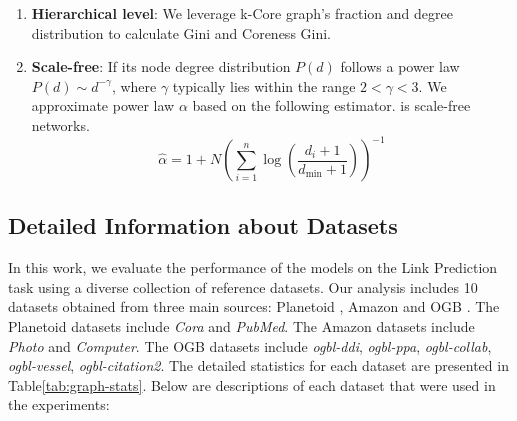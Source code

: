 \begin{enumerate}[left=0pt, labelsep=0.5em, itemsep=0em]
    \item \textbf{Hierarchical level}: We leverage k-Core graph's fraction and degree distribution to calculate Gini and Coreness Gini. 
    \item \textbf{Scale-free}: If its node degree distribution $P(d)$ follows a power law $P(d) \sim d^{-\gamma}$, where $\gamma$ typically lies within the range $2 < \gamma < 3$. We approximate power law $\alpha$ based on the following estimator.  is scale-free networks.
    \begin{equation}
        \hat{\alpha} = 1 + N\left( \sum_{i=1}^{n} \log\left(\frac{d_i + 1}{d_{\min} + 1}\right) \right)^{-1}
\end{equation}
\end{enumerate}

\subsection{Detailed Information about Datasets}
\label{subsec:detail-dataset}
In this work, we evaluate the performance of the models on the Link Prediction task using a diverse collection of reference datasets. Our analysis includes 10 datasets obtained from three main sources: Planetoid \cite{Sen2008CollectiveClassification}, Amazon \cite{Shchur2018Pitfalls} and OGB \cite{Hu2020OGB}. The Planetoid datasets include \textit{Cora} and \textit{PubMed}. The Amazon datasets include \textit{Photo} and \textit{Computer}. The OGB datasets include \textit{ogbl-ddi}, \textit{ogbl-ppa}, \textit{ogbl-collab}, \textit{ogbl-vessel}, \textit{ogbl-citation2}. The detailed statistics for each dataset are presented in Table\ref{tab:graph-stats}. Below are descriptions of each dataset that were used in the experiments:
